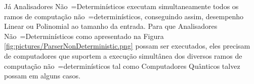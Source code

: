 {    Já Analisadores Não~=Determinísticos executam simultaneamente todos os ramos de computação não~=determinísticos,
    conseguindo assim, desempenho Linear ou
    Polinomial ao tamanho da entrada.
    Para que Analisadores Não~=Determinísticos como apresentado na Figura \ref{fig:pictures/ParserNonDeterministic.png} possam ser executados,
    eles precisam de computadores que suportem a execução simultânea dos diversos ramos de computação não~=determinísticos tal como Computadores Quânticos talvez possam em alguns casos.
}

